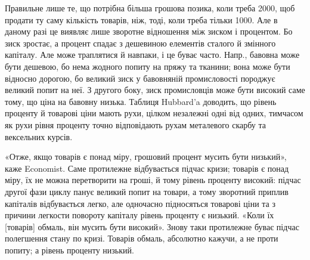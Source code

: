 Правильне лише те, що потрібна більша грошова позика, коли треба
2000, щоб продати ту саму кількість товарів, ніж, тоді, коли треба
тільки 1000. Але в даному разі це виявляє лише зворотне відношення
між зиском і процентом. Бо зиск зростає, а процент спадає з дешевиною елементів
сталого й змінного капіталу. Але може траплятися й навпаки, і це буває
часто. Напр., бавовна може бути дешевою, бо нема жодного попиту на
пряжу та тканини; вона може бути відносно дорогою, бо великий зиск у бавовняній
промисловості породжує великий попит на неї. З другого боку, зиск промисловців
може бути високий саме тому, що ціна на бавовну низька. Таблиця
Hubbard’a доводить, що рівень проценту й товарові ціни мають рухи, цілком незалежні
одні від одних, тимчасом як рухи рівня проценту точно відповідають
рухам металевого скарбу та вексельних курсів.

«Отже, якщо товарів є понад міру, грошовий процент мусить бути низький»,
каже Economist. Саме протилежне відбувається підчас кризи; товарів є понад міру, їх
не можна перетворити на гроші, й тому рівень проценту високий: підчас другої фази
циклу панує великий попит на товари, а тому зворотний приплив капіталів відбувається
легко, але одночасно підносяться товарові ціни та з причини легкости повороту
капіталу рівень проценту є низький. «Коли їх [товарів] обмаль, він мусить
бути високий». Знову таки протилежне буває підчас полегшення стану по кризі. Товарів
обмаль, абсолютно кажучи, а не проти попиту; а рівень проценту низький.
